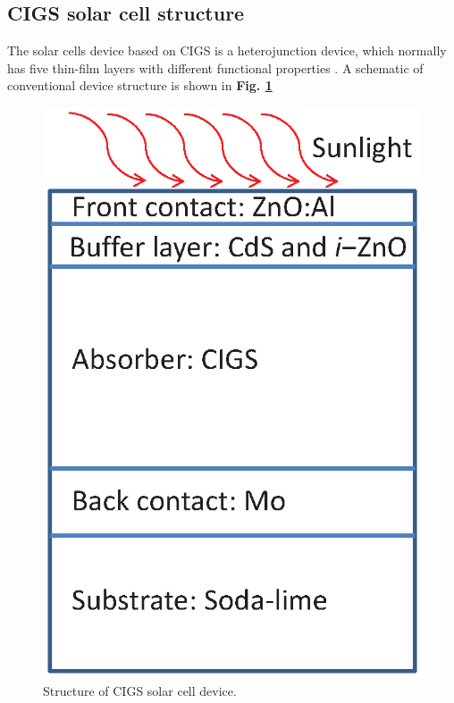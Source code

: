 \documentclass[a4paper, 12pt, titlepage,oneside,drop]{kthesis}
\begin{document}
\subsection{CIGS solar cell structure}

The solar cells device based on CIGS is a heterojunction device, which normally has five thin-film layers with different functional properties \cite{lundberg2005effect, lundberg2003diffusion, ramanathan2003properties}.
A schematic of conventional device structure is shown in  \textbf{Fig. \ref{device}}

\begin{figure}[H]
\centering
\includegraphics[scale=0.5]{cigsdevice.eps} 
\caption{Structure of CIGS solar cell device.}
\label{device}
\end{figure}
\end{document}

